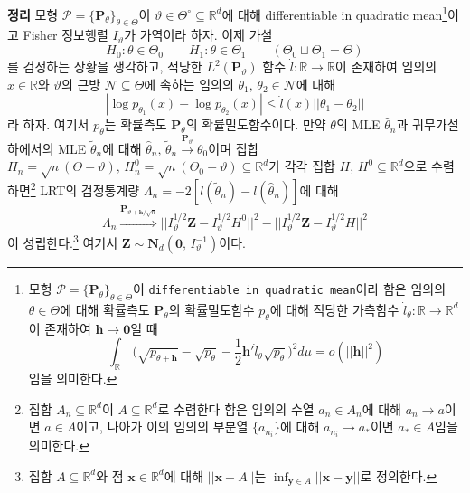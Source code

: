 \documentclass[11pt,onecolumn,twoside,a4size]{gsag3jnl}
\begin{document}
\noindent\textsf{\textbf{정리} 모형 $\mathcal{P}=\{\mathbf{P}_\theta\}_{\theta\in\Theta}$이 $\vartheta\in\Theta^\circ\subseteq\mathbb{R}^d$에 대해 differentiable in quadratic mean\footnote{모형 $\mathcal{P}=\{\mathbf{P}_\theta\}_{\theta\in\Theta}$이 \texttt{differentiable in quadratic mean}이라 함은 임의의 $\theta\in\Theta$에 대해 확률측도 $\mathbf{P}_\theta$의 확률밀도함수 $p_\theta$에 대해 적당한 가측함수 $\dot{l}_\theta:\mathbb{R}\to\mathbb{R}^d$이 존재하여 $\mathbf{h}\to\mathbf{0}$일 때
\begin{equation}
  \int_{\mathbb{R}}\,\bigg(\sqrt{p_{\theta+\mathbf{h}}}-\sqrt{p_{\theta}}-\frac{1}{2}\mathbf{h}'\dot{l}_\theta\sqrt{p_\theta}\bigg)^2d\mu=o(||\mathbf{h}||^2)
\end{equation}
임을 의미한다.}이고 Fisher 정보행렬 $I_{\vartheta}$가 가역이라 하자. 이제 가설
\begin{equation}
  H_0:\theta\in\Theta_0\qquad H_1:\theta\in\Theta_1\qquad(\Theta_0\sqcup\Theta_1=\Theta)
\end{equation}
를 검정하는 상황을 생각하고, 적당한 $L^2(\mathbf{P}_{\vartheta})$ 함수 $\dot{l}:\mathbb{R}\to\mathbb{R}$이 존재하여 임의의 $x\in\mathbb{R}$와 $\vartheta$의 근방 $\mathcal{N}\subseteq\Theta$에 속하는 임의의 $\theta_1,\,\theta_2\in\mathcal{N}$에 대해
\begin{equation}
  |\log p_{\theta_1}(x)-\log p_{\theta_2}(x)|\leq\dot{l}(x)||\theta_1-\theta_2||
\end{equation}
라 하자. 여기서 $p_\theta$는 확률측도 $\mathbf{P}_\theta$의 확률밀도함수이다. 만약 $\theta$의 MLE $\widehat{\theta}_n$과 귀무가설 하에서의 MLE $\widetilde{\theta}_n$에 대해 $\widehat{\theta}_n,\,\widetilde{\theta}_n\stackrel{\mathbf{P}_{\vartheta}}{\to}\theta_0$이며 집합 $H_n=\sqrt{n}(\Theta-\vartheta),\,H_n^0=\sqrt{n}(\Theta_0-\vartheta)\subseteq\mathbb{R}^d$가 각각 집합 $H,\,H^0\subseteq\mathbb{R}^d$으로 수렴하면\footnote{집합 $A_n\subseteq\mathbb{R}^d$이 $A\subseteq\mathbb{R}^d$로 수렴한다 함은 임의의 수열 $a_n\in A_n$에 대해 $a_n\to a$이면 $a\in A$이고, 나아가 이의 임의의 부분열 $\{a_{n_i}\}$에 대해 $a_{n_i}\to a_*$이면 $a_*\in A$임을 의미한다.} LRT의 검정통계량 $\Lambda_n=-2[l(\widetilde{\theta}_n)-l(\widehat{\theta}_n)]$에 대해
\begin{equation}
  \Lambda_n\stackrel{\mathbf{P}_{\vartheta+\mathbf{h}/\sqrt{n}}}{\Rightarrow}||I_{\vartheta}^{1/2}\mathbf{Z}-I_{\vartheta}^{1/2}H^0||^2-||I_{\vartheta}^{1/2}\mathbf{Z}-I_{\vartheta}^{1/2}H||^2
\end{equation}
이 성립한다.\footnote{집합 $A\subseteq\mathbb{R}^d$와 점 $\mathbf{x}\in\mathbb{R}^d$에 대해 $||\mathbf{x}-A||$는 $\inf_{\mathbf{y}\in A}||\mathbf{x}-\mathbf{y}||$로 정의한다.} 여기서 $\mathbf{Z}\sim\mathbf{N}_d(\mathbf{0},\,I_\vartheta^{-1})$이다.}
\end{document}
